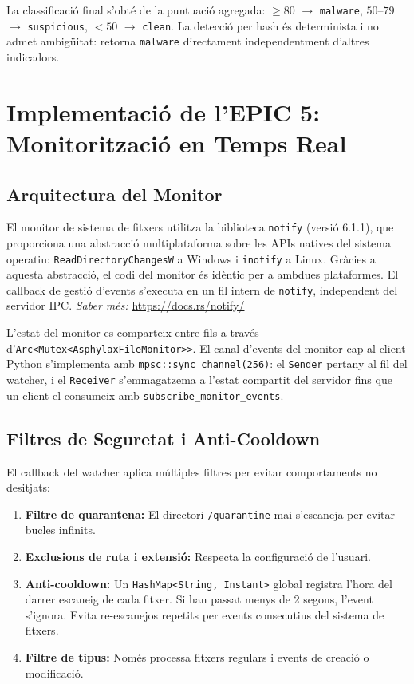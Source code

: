 \documentclass[12pt,a4paper]{report}
\begin{document}
La classificació final s'obté de la puntuació agregada: $\geq 80$ $\to$ \texttt{malware}, $50$--$79$ $\to$ \texttt{suspicious}, $< 50$ $\to$ \texttt{clean}. La detecció per hash és determinista i no admet ambigüitat: retorna \texttt{malware} directament independentment d'altres indicadors.

\section{Implementació de l'EPIC 5: Monitorització en Temps Real}

\subsection{Arquitectura del Monitor}
El monitor de sistema de fitxers utilitza la biblioteca \texttt{notify} (versió 6.1.1), que proporciona una abstracció multiplataforma sobre les APIs natives del sistema operatiu: \texttt{ReadDirectoryChangesW} a Windows i \texttt{inotify} a Linux. Gràcies a aquesta abstracció, el codi del monitor és idèntic per a ambdues plataformes. El callback de gestió d'events s'executa en un fil intern de \texttt{notify}, independent del servidor IPC. \textit{Saber més:} \url{https://docs.rs/notify/}

L'estat del monitor es comparteix entre fils a través d'\texttt{Arc<Mutex<AsphylaxFileMonitor>>}. El canal d'events del monitor cap al client Python s'implementa amb \texttt{mpsc::sync\_channel(256)}: el \texttt{Sender} pertany al fil del watcher, i el \texttt{Receiver} s'emmagatzema a l'estat compartit del servidor fins que un client el consumeix amb \texttt{subscribe\_monitor\_events}.

\subsection{Filtres de Seguretat i Anti-Cooldown}
El callback del watcher aplica múltiples filtres per evitar comportaments no desitjats:
\begin{enumerate}
    \item \textbf{Filtre de quarantena:} El directori \texttt{/quarantine} mai s'escaneja per evitar bucles infinits.
    \item \textbf{Exclusions de ruta i extensió:} Respecta la configuració de l'usuari.
    \item \textbf{Anti-cooldown:} Un \texttt{HashMap<String, Instant>} global registra l'hora del darrer escaneig de cada fitxer. Si han passat menys de 2 segons, l'event s'ignora. Evita re-escanejos repetits per events consecutius del sistema de fitxers.
    \item \textbf{Filtre de tipus:} Només processa fitxers regulars i events de creació o modificació.
\end{enumerate}
\end{document}
